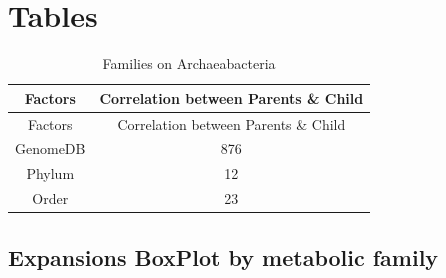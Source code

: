 \documentclass[12pt,twoside]{reedthesis}
\begin{document}
  \section{Tables}\label{tables}
  
  \begin{longtable}[c]{@{}cc@{}}
  \caption{Families on Archaeabacteria \label{tab:inher}}\tabularnewline
  \toprule
  Factors & Correlation between Parents \& Child\tabularnewline
  \midrule
  \endfirsthead
  \toprule
  Factors & Correlation between Parents \& Child\tabularnewline
  \midrule
  \endhead
  GenomeDB & 876\tabularnewline
  Phylum & 12\tabularnewline
  Order & 23\tabularnewline
  \bottomrule
  \end{longtable}
  
  \clearpage
  
  \subsection{Expansions BoxPlot by metabolic
  family}\label{expansions-boxplot-by-metabolic-family}
  
  \begin{Shaded}
  \begin{Highlighting}[]
  \NormalTok{(} \NormalTok{, } \NormalTok{,} \NormalTok{, } \NormalTok{)}
  \end{Highlighting}
  \end{Shaded}
  
\end{document}
